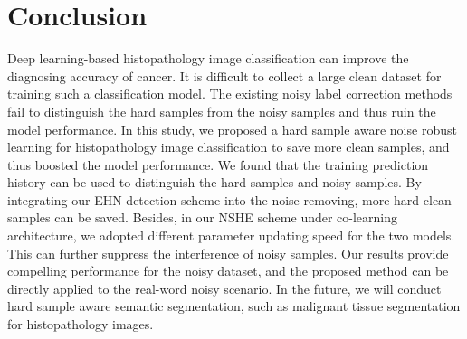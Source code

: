 \section{Conclusion}
\label{sec:conclusion}
Deep learning-based histopathology image classification can improve the diagnosing accuracy of cancer. It is difficult to collect a large clean dataset for training such a classification model. The existing noisy label correction methods fail to distinguish the hard samples from the noisy samples and thus ruin the model performance. In this study, we proposed a hard sample aware noise robust learning for histopathology image classification to save more clean samples, and thus boosted the model performance. We found that the training prediction history can be used to distinguish the hard samples and noisy samples. By integrating our EHN detection scheme into the noise removing, more hard clean samples can be saved. Besides, in our NSHE scheme under co-learning architecture, we adopted different parameter updating speed for the two models. This can further suppress the interference of noisy samples. Our results provide compelling performance for the noisy dataset, and the proposed method can be directly applied to the real-word noisy scenario. In the future, we will conduct hard sample aware semantic segmentation, such as malignant tissue segmentation for histopathology images. 